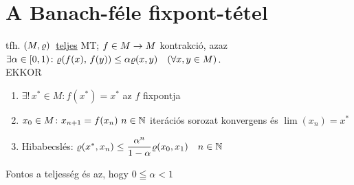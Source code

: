 \newpage
\section{A Banach-féle fixpont-tétel}
\begin{te}
  tfh. $(M,\varrho)\,$ \underline{teljes} MT; $f\in M\to M$ kontrakció, azaz
  $\exists \alpha \in [0,1)\colon \varrho( f(x),\, f(y)) \leq \alpha
    \varrho(x,y) \quad (\forall x,y\in M)$.\\
    EKKOR \begin{enumerate}
    \item$\exists!\, x^*\in M\colon f(x^*) = x^*$ az $f$ fixpontja
    \item $x_0\in M\colon x_{n+1} = f(x_n)\ n\in \mathbb{N}$ iterációs
      sorozat konvergens és $\lim(x_n) = x^*$
    \item Hibabecslés: $\varrho(x^*,x_n) \leq
      \dfrac{\alpha^n}{1-\alpha}\varrho(x_0,x_1)\quad n\in \mathbb{N}$
    \end{enumerate}
\end{te}
\begin{megj}
  Fontos a teljesség és az, hogy $0\leqq \alpha < 1$
\end{megj}

